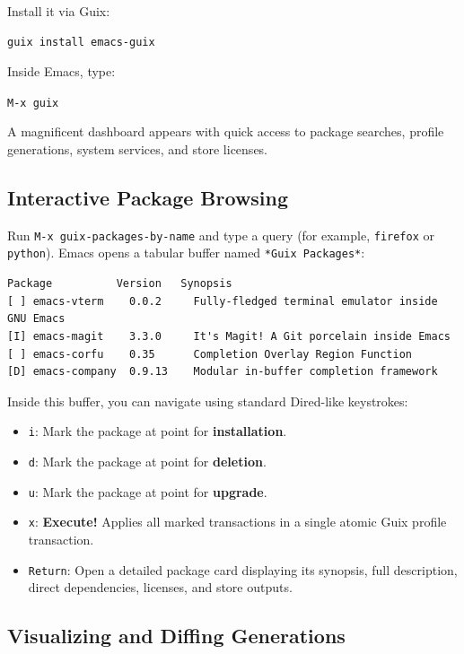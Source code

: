 Install it via Guix:
\begin{lstlisting}[style=guixcli]
guix install emacs-guix
\end{lstlisting}

Inside Emacs, type:
\begin{center}
\texttt{M-x guix}
\end{center}
A magnificent dashboard appears with quick access to package searches, profile generations, system services, and store licenses.

\subsection{Interactive Package Browsing}

Run \texttt{M-x guix-packages-by-name} and type a query (for example, \texttt{firefox} or \texttt{python}). Emacs opens a tabular buffer named \texttt{*Guix Packages*}:

\begin{lstlisting}[style=guixcli]
  Package          Version   Synopsis
[ ] emacs-vterm    0.0.2     Fully-fledged terminal emulator inside GNU Emacs
[I] emacs-magit    3.3.0     It's Magit! A Git porcelain inside Emacs
[ ] emacs-corfu    0.35      Completion Overlay Region Function
[D] emacs-company  0.9.13    Modular in-buffer completion framework
\end{lstlisting}

Inside this buffer, you can navigate using standard Dired-like keystrokes:
\begin{itemize}
  \item \texttt{i}: Mark the package at point for \textbf{installation}.
  \item \texttt{d}: Mark the package at point for \textbf{deletion}.
  \item \texttt{u}: Mark the package at point for \textbf{upgrade}.
  \item \texttt{x}: \textbf{Execute!} Applies all marked transactions in a single atomic Guix profile transaction.
  \item \texttt{Return}: Open a detailed package card displaying its synopsis, full description, direct dependencies, licenses, and store outputs.
\end{itemize}

\subsection{Visualizing and Diffing Generations}

